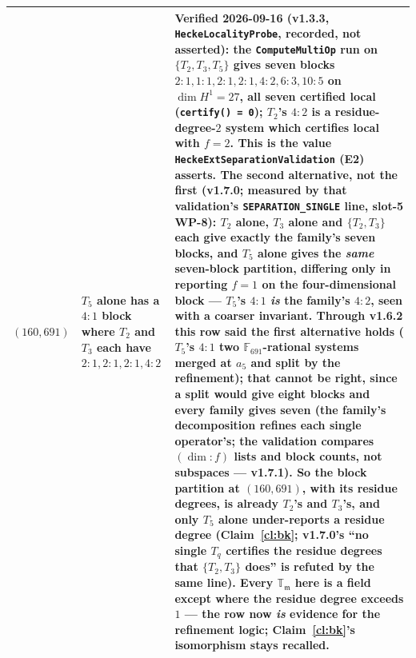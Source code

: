 \documentclass[11pt]{article}
\theoremstyle{remark}
\newcommand{\F}{\mathbb{F}}
\newcommand{\T}{\mathbb{T}}
\newcommand{\m}{\mathfrak{m}}
\begin{document}
\begin{center}
\begin{tabular}{@{}>{\raggedright\arraybackslash}p{1.6cm}>{\raggedright\arraybackslash}p{5.2cm}>{\raggedright\arraybackslash}p{8.6cm}@{}}
$(160,691)$ & $T_5$ alone has a $4{:}1$ block where $T_2$ and $T_3$ each have
$2{:}1,2{:}1,2{:}1,4{:}2$ & \textbf{Verified 2026-09-16} (v1.3.3, \texttt{HeckeLocalityProbe},
recorded, not asserted): the \texttt{ComputeMultiOp} run on $\{T_2,T_3,T_5\}$ gives seven blocks
$2{:}1,1{:}1,2{:}1,2{:}1,4{:}2,6{:}3,10{:}5$ on $\dim H^1=27$, all seven certified local
(\texttt{certify() = 0}); $T_2$'s $4{:}2$ is a residue-degree-$2$ system which certifies local
with $f=2$. This is the value \texttt{HeckeExtSeparationValidation} (E2) asserts.
\textbf{The second alternative, not the first} (v1.7.0; measured by that validation's
\texttt{SEPARATION\_SINGLE} line, slot-5 WP-8): $T_2$ alone, $T_3$ alone and $\{T_2,T_3\}$ each
give exactly the family's seven blocks, and $T_5$ alone gives the \emph{same} seven-block
partition, differing only in reporting $f=1$ on the four-dimensional block --- $T_5$'s $4{:}1$
\emph{is} the family's $4{:}2$, seen with a coarser invariant. Through v1.6.2 this row said the
first alternative holds ($T_5$'s $4{:}1$ two $\F_{691}$-rational systems merged at $a_5$ and
split by the refinement); that cannot be right, since a split would give eight blocks and every
family gives seven (the family's decomposition refines each single operator's; the validation
compares $(\dim{:}f)$ lists and block counts, not subspaces --- v1.7.1). So the block partition
at $(160,691)$, with its residue degrees, is already $T_2$'s and $T_3$'s, and only $T_5$ alone
under-reports a residue degree (Claim~\ref{cl:bk}; v1.7.0's ``no single $T_q$ certifies the
residue degrees that $\{T_2,T_3\}$ does'' is refuted by the same line). Every $\T_\m$ here is a field except where the residue degree exceeds $1$
--- the row now \emph{is} evidence for the refinement logic; Claim~\ref{cl:bk}'s isomorphism
stays recalled. \\
\bottomrule
\end{tabular}
\end{center}
\end{document}
